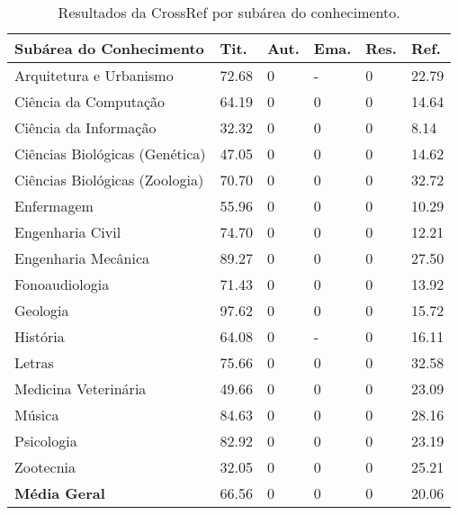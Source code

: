 \begin{table}
    \caption{Resultados da CrossRef por subárea do conhecimento.}
    \begin{center}
        \begin{tabular}{|p{6cm}|C{1.2cm}|C{1.2cm}|C{1.2cm}|C{1.2cm}|C{1.2cm}|}
            \hline 
            \textbf{Subárea do Conhecimento} & \textbf{Tit.} & \textbf{Aut.} & \textbf{Ema.} & \textbf{Res.} & \textbf{Ref.} \\ \hline 
            Arquitetura e Urbanismo & 72.68 & 0 & - & 0 & 22.79 \\ \hline
            Ciência da Computação & 64.19 & 0 & 0 & 0 & 14.64 \\ \hline
            Ciência da Informação & 32.32 & 0 & 0 & 0 & 8.14 \\ \hline
            Ciências Biológicas (Genética) & 47.05 & 0 & 0 & 0 & 14.62 \\ \hline
            Ciências Biológicas (Zoologia) & 70.70 & 0 & 0 & 0 & 32.72 \\ \hline
            Enfermagem & 55.96 & 0 & 0 & 0 & 10.29 \\ \hline
            Engenharia Civil & 74.70 & 0 & 0 & 0 & 12.21 \\ \hline
            Engenharia Mecânica & 89.27 & 0 & 0 & 0 & 27.50 \\ \hline
            Fonoaudiologia & 71.43 & 0 & 0 & 0 & 13.92 \\ \hline
            Geologia & 97.62 & 0 & 0 & 0 & 15.72 \\ \hline
            História & 64.08 & 0 & - & 0 & 16.11 \\ \hline
            Letras & 75.66 & 0 & 0 & 0 & 32.58 \\ \hline
            Medicina Veterinária & 49.66 & 0 & 0 & 0 & 23.09 \\ \hline
            Música & 84.63 & 0 & 0 & 0 & 28.16 \\ \hline
            Psicologia & 82.92 & 0 & 0 & 0 & 23.19 \\ \hline
            Zootecnia & 32.05 & 0 & 0 & 0 & 25.21 \\ \hline
            \textbf{Média Geral} & 66.56 & 0 & 0 & 0 & 20.06 \\ \hline
        \end{tabular}
    \end{center}
    \label{tab:results-crossref}
\end{table}

